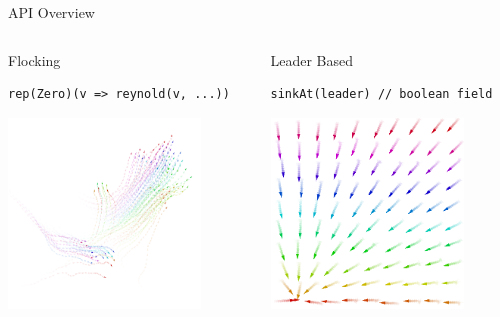 \documentclass[presentation, 9pt]{beamer}\mode<presentation>{\usetheme{AMSBolognaFC}}
\begin{document}
\begin{frame}[fragile]{API Overview}
\begin{columns}
\begin{column}{0.3\textwidth}
\begin{exampleblock}{Flocking}
\begin{verbatim}
rep(Zero)(v => reynold(v, ...))
\end{verbatim}
\centering
\includegraphics[width=0.8\textwidth]{img/flock.png}
\end{exampleblock}

\end{column}

\begin{column}{0.3\textwidth}

	\begin{exampleblock}{Leader Based}
	\begin{verbatim}
sinkAt(leader) // boolean field
	\end{verbatim}
	\centering
	\includegraphics[width=0.8\textwidth]{img/towards-leader.png}
	\end{exampleblock}
\end{column}


\end{columns}
\end{frame}
\end{document}
